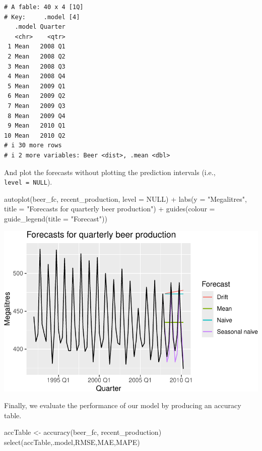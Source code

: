 \documentclass[
  letterpaper,
  DIV=11,
  numbers=noendperiod]{scrartcl}
\newenvironment{Shaded}{\begin{snugshade}}{\end{snugshade}}
\newcommand{\AttributeTok}[1]{\textcolor[rgb]{0.40,0.45,0.13}{#1}}
\newcommand{\ConstantTok}[1]{\textcolor[rgb]{0.56,0.35,0.01}{#1}}
\newcommand{\FunctionTok}[1]{\textcolor[rgb]{0.28,0.35,0.67}{#1}}
\newcommand{\NormalTok}[1]{\textcolor[rgb]{0.00,0.23,0.31}{#1}}
\newcommand{\OtherTok}[1]{\textcolor[rgb]{0.00,0.23,0.31}{#1}}
\newcommand{\SpecialCharTok}[1]{\textcolor[rgb]{0.37,0.37,0.37}{#1}}
\newcommand{\StringTok}[1]{\textcolor[rgb]{0.13,0.47,0.30}{#1}}
\begin{document}
\begin{verbatim}
# A fable: 40 x 4 [1Q]
# Key:     .model [4]
   .model Quarter
   <chr>    <qtr>
 1 Mean   2008 Q1
 2 Mean   2008 Q2
 3 Mean   2008 Q3
 4 Mean   2008 Q4
 5 Mean   2009 Q1
 6 Mean   2009 Q2
 7 Mean   2009 Q3
 8 Mean   2009 Q4
 9 Mean   2010 Q1
10 Mean   2010 Q2
# i 30 more rows
# i 2 more variables: Beer <dist>, .mean <dbl>
\end{verbatim}

And plot the forecasts without plotting the prediction intervals (i.e.,
\texttt{level\ =\ NULL}).

\begin{Shaded}
\begin{Highlighting}[]
\FunctionTok{autoplot}\NormalTok{(beer\_fc, recent\_production, }\AttributeTok{level =} \ConstantTok{NULL}\NormalTok{) }\SpecialCharTok{+}
  \FunctionTok{labs}\NormalTok{(}\AttributeTok{y =} \StringTok{"Megalitres"}\NormalTok{, }\AttributeTok{title =} \StringTok{"Forecasts for quarterly beer production"}\NormalTok{) }\SpecialCharTok{+}
  \FunctionTok{guides}\NormalTok{(}\AttributeTok{colour =} \FunctionTok{guide\_legend}\NormalTok{(}\AttributeTok{title =} \StringTok{"Forecast"}\NormalTok{))}
\end{Highlighting}
\end{Shaded}

\begin{center}
\includegraphics{chapter5_review_files/figure-pdf/unnamed-chunk-53-1.pdf}
\end{center}

Finally, we evaluate the performance of our model by producing an
accuracy table.

\begin{Shaded}
\begin{Highlighting}[]
\NormalTok{accTable }\OtherTok{\textless{}{-}} \FunctionTok{accuracy}\NormalTok{(beer\_fc, recent\_production)}
\FunctionTok{select}\NormalTok{(accTable,.model,RMSE,MAE,MAPE)}
\end{Highlighting}
\end{Shaded}
\end{document}
